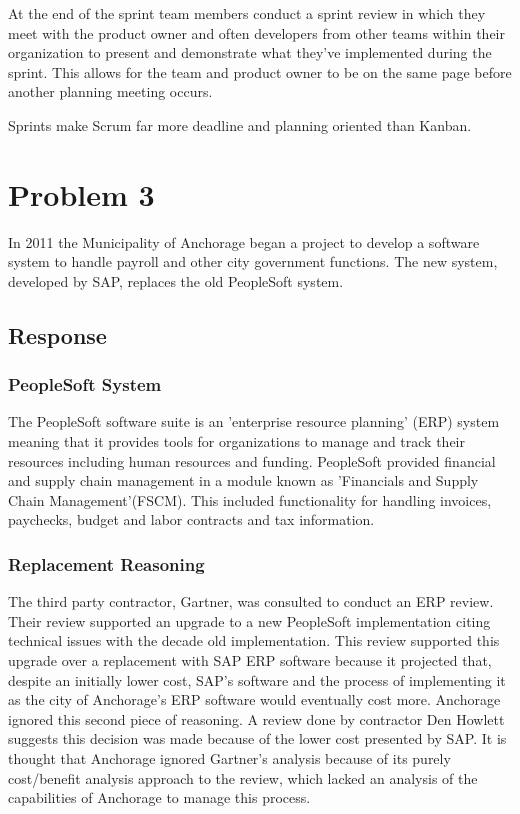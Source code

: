 \documentclass{article}
\begin{document}
  At the end of the sprint team members conduct a sprint review in which they meet with the
  product owner and often developers from other teams within their organization to present and
  demonstrate what they've implemented during the sprint. This allows for the team and product
  owner to be on the same page before another planning meeting occurs.

  Sprints make Scrum far more deadline and planning oriented than Kanban.


\section{Problem 3}
In 2011 the Municipality of Anchorage began a project to develop a software system
to handle payroll and other city government functions.
The new system, developed by SAP, replaces the old PeopleSoft system.
\subsection{Response}
  \subsubsection{PeopleSoft System}
    The PeopleSoft software suite is an 'enterprise resource planning' (ERP) system
    meaning that it provides tools for organizations to manage and track their resources
    including human resources and funding. PeopleSoft provided financial and supply chain
    management in a module known as 'Financials and Supply Chain Management'(FSCM). This included
    functionality for handling invoices, paychecks, budget and labor contracts and tax information.
  \subsubsection{Replacement Reasoning}
  The third party contractor, Gartner, was consulted to conduct an ERP review. Their review
  supported an upgrade to a new PeopleSoft implementation citing technical issues with
  the decade old implementation. This review supported this upgrade over a replacement with SAP
  ERP software because it projected that, despite an initially lower cost, SAP's software
  and the process of implementing it as the city of Anchorage's ERP software would eventually
  cost more. Anchorage ignored this second piece of reasoning. A review done by contractor Den
  Howlett suggests this decision was made because of the lower cost presented by SAP. It is thought
  that Anchorage ignored Gartner's analysis because of its purely cost/benefit analysis approach to the
  review, which lacked an analysis of the capabilities of Anchorage to manage this process.
\end{document}

